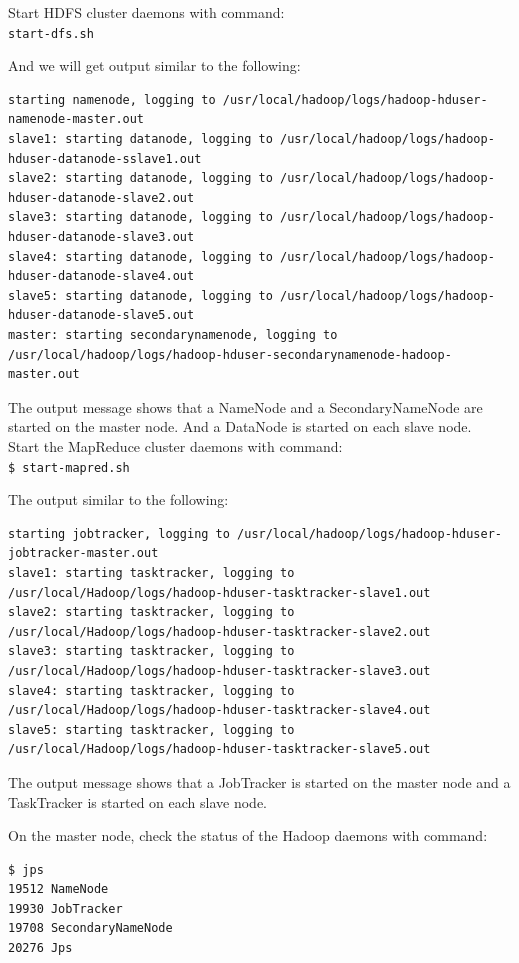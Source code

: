 Start HDFS cluster daemons with command: \\
\verb|start-dfs.sh|

And we will get output similar to the following:
\lstset{style=bashstyle}
\begin{lstlisting}
starting namenode, logging to /usr/local/hadoop/logs/hadoop-hduser-namenode-master.out
slave1: starting datanode, logging to /usr/local/hadoop/logs/hadoop-hduser-datanode-sslave1.out
slave2: starting datanode, logging to /usr/local/hadoop/logs/hadoop-hduser-datanode-slave2.out
slave3: starting datanode, logging to /usr/local/hadoop/logs/hadoop-hduser-datanode-slave3.out
slave4: starting datanode, logging to /usr/local/hadoop/logs/hadoop-hduser-datanode-slave4.out
slave5: starting datanode, logging to /usr/local/hadoop/logs/hadoop-hduser-datanode-slave5.out
master: starting secondarynamenode, logging to /usr/local/hadoop/logs/hadoop-hduser-secondarynamenode-hadoop-master.out
\end{lstlisting}

The output message shows that a NameNode and a SecondaryNameNode are started on the master node. And a DataNode is started on each slave node. \\
Start the MapReduce cluster daemons with command: \\
\verb|$ start-mapred.sh|

The output similar to the following:
\lstset{style=bashstyle}
\begin{lstlisting}
starting jobtracker, logging to /usr/local/hadoop/logs/hadoop-hduser-jobtracker-master.out
slave1: starting tasktracker, logging to /usr/local/Hadoop/logs/hadoop-hduser-tasktracker-slave1.out
slave2: starting tasktracker, logging to /usr/local/Hadoop/logs/hadoop-hduser-tasktracker-slave2.out
slave3: starting tasktracker, logging to /usr/local/Hadoop/logs/hadoop-hduser-tasktracker-slave3.out
slave4: starting tasktracker, logging to /usr/local/Hadoop/logs/hadoop-hduser-tasktracker-slave4.out
slave5: starting tasktracker, logging to /usr/local/Hadoop/logs/hadoop-hduser-tasktracker-slave5.out
\end{lstlisting}

The output message shows that a JobTracker is started on the master node and a TaskTracker is started on each slave node.

On the master node, check the status of the Hadoop daemons with command:
\begin{verbatim}
$ jps
19512 NameNode
19930 JobTracker
19708 SecondaryNameNode
20276 Jps
\end{verbatim}

